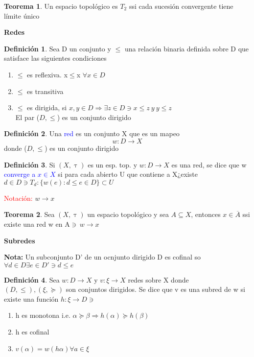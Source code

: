 \documentclass{article}
\theoremstyle{definition}
\newtheorem{definition}{Definición}[section]
\newtheorem{theorem}{Teorema}[section]
\begin{document}

\begin{theorem}
	Un espacio topológico es $T_2$ ssi cada sucesión convergente tiene límite único
\end{theorem}
\begin{LARGE}
	\textbf{Redes}
\end{LARGE}
\begin{definition}
	Sea D un conjunto y $\leq$ una relación binaria definida sobre D que satisface las siguientes condiciones 
	\begin{enumerate}
		\item $\leq$ es reflexiva. x$\leq$x $\forall x\in D$
		\item $\leq$ es transitiva
		\item $\leq$ es dirigida, si $x,y\in D\Rightarrow\exists z\in D\ni x\leq z\ y \ y\leq z$\\
		El par ($D,\leq$) es un conjunto dirigido
	\end{enumerate}
\end{definition}
\begin{definition}
	Una \textcolor{blue}{red} es un conjunto X que es un mapeo
	\[w:D\to X\]
	donde ($D,\leq$) es un conjunto dirigido
\end{definition}
\begin{definition}
	Si $(X,\uptau)$ es un esp. top. y $w:D\to X$ es una red, se dice que w \textcolor{blue}{converge a $x\in X$} si para cada abierto U que contiene a X¿existe $d\in D\ni T_d:\{w(e):d\leq e\in D\}\subset U$
\end{definition}
\textcolor{red}{Notación: }$w\to x$
\begin{theorem}
	Sea $(X,\uptau)$ un espacio topológico y sea $A\subseteq X$, entonces $x\in \overline{A}$ ssi existe una red w en A$\ni\ w\to x$
\end{theorem}
\begin{LARGE}
	\textbf{Subredes}
\end{LARGE}
\textbf{Nota: } Un subconjunto D' de un ocnjunto dirigido D es cofinal so $\forall d\in D\exists e \in D'\ni d\leq e$
\begin{definition}
	Sea $w:D\to X$ y $v:\xi\to X$ redes sobre X donde $(D,\leq),(\xi,\succeq)$ son conjuntos dirigidos. Se dice que v es una subred de w si existe una función $h:\xi\to D\ni$
	\begin{enumerate}
		\item h es monotona i.e. $\alpha\succeq\beta\Rightarrow h(\alpha)\succeq h(\beta)$
		\item h es cofinal
		\item $v(\alpha)=w(h\alpha)\forall a \in \xi$
	\end{enumerate}
\end{definition}
\end{document}
